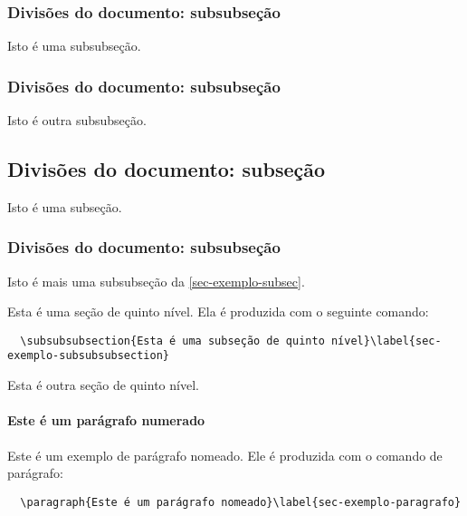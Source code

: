 \subsubsection{Divisões do documento: subsubseção}
\label{sec-divisoes-subsubsection}
Isto é uma subsubseção.

\subsubsection{Divisões do documento: subsubseção}
Isto é outra subsubseção.

\subsection{Divisões do documento: subseção}\label{sec-exemplo-subsec}
Isto é uma subseção.

\subsubsection{Divisões do documento: subsubseção}
Isto é mais uma subsubseção da \autoref{sec-exemplo-subsec}.

\label{sec-exemplo-subsubsubsection}
Esta é uma seção de quinto nível. Ela é produzida com o seguinte comando:

\begin{verbatim}
  \subsubsubsection{Esta é uma subseção de quinto nível}\label{sec-exemplo-subsubsubsection}
\end{verbatim}

\label{sec-exemplo-subsubsubsection-outro}
Esta é outra seção de quinto nível.

\paragraph{Este é um parágrafo numerado}\label{sec-exemplo-paragrafo}

Este é um exemplo de parágrafo nomeado. Ele é produzida com o comando de parágrafo:

\begin{verbatim}
  \paragraph{Este é um parágrafo nomeado}\label{sec-exemplo-paragrafo}
\end{verbatim}

